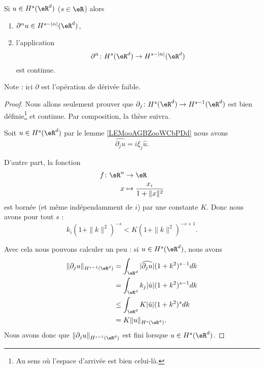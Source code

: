 \begin{proposition}
    Si \( u\in H^s(\eR^d)\) (\( s\in \eR\)) alors
    \begin{enumerate}
        \item
            \( \partial^{\alpha}u\in H^{s-| \alpha |}(\eR^d)\),
        \item
            l'application
            \begin{equation}
                \partial^{\alpha}\colon H^s(\eR^d)\to H^{s-| \alpha |}(\eR^d)
            \end{equation}
            est continue.
    \end{enumerate}
\end{proposition}
Note : ici \( \partial\) est l'opération de dérivée faible.

\begin{proof}
    Nous allons seulement prouver que \( \partial_j\colon H^s(\eR^d)\to  H^{s-1}(\eR^d) \) est bien définie\footnote{Au sens où l'espace d'arrivée est bien celui-là.} et continue. Par composition, la thèse suivra.

    Soit \( u\in H^s(\eR^d)\) par le lemme \ref{LEMooAGBZooWCbPDd} nous avons
    \begin{equation}
        \widehat{\partial_ju}=i\xi_j\hat u.
    \end{equation}
    
    D'autre part, la fonction
    \begin{equation}
        \begin{aligned}
            f\colon \eR^n&\to \eR \\
            x&\mapsto \frac{ x_i }{ 1+\| x \|^2 } 
        \end{aligned}
    \end{equation}
    est bornée (et même indépendamment de \( i\)) par une constante \( K\). Donc nous avons pour tout \( s\) :
    \begin{equation}
        k_i(1+\| k \|^2)^{-s}<K(1+\| k \|^2)^{-s+1}.
    \end{equation}
    
    Avec cela nous pouvons calculer un peu : si \( u\in H^s(\eR^d)\), nous avons
    \begin{subequations}
        \begin{align}
            \| \partial_ju \|_{H^{s-1}(\eR^d)}&=\int_{\eR^d}| \widehat{\partial_ju} |(1+k^2)^{s-1}dk\\
            &=\int_{\eR^d}k_j| \hat u |(1+k^2)^{s-1}dk\\
            &\leq \int_{\eR^d}K| \hat u |(1+k^2)^sdk\\
            &=K\| u \|_{H^s(\eR^d)}.
        \end{align}
    \end{subequations}
    Nous avons donc que \( \| \partial_ju \|_{H^{s-1}(\eR^d)}\) est fini lorsque \( u\in H^s(\eR^d)\). 


\end{proof}
